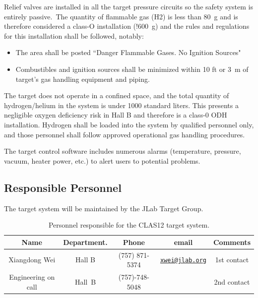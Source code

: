 Relief valves are installed in all the target pressure circuits so the safety system is entirely passive.~The quantity of flammable gas (H2) is less than 80~g and is therefore considered a class-O installation (!600~g) and the rules and regulations for this installation shall be followed, notably:

\begin{itemize}
\item The area shall be posted ``Danger Flammable Gases. No Ignition Sources" 
\item Combustibles and ignition sources shall be minimized within 10 ft or 3~m of target’s gas handling equipment and piping.
\end{itemize}

The target does not operate in a confined space, and the total quantity of hydrogen/helium in the system is under 1000 standard liters. This presents a negligible oxygen deficiency risk in Hall B and therefore is a class-0 ODH installation.  Hydrogen shall be loaded into the system by qualified personnel only, and those personnel shall follow approved operational gas handling procedures.

The target control software includes numerous alarms (temperature, pressure, vacuum, heater power, etc.) to alert users to potential problems.

\subsection{Responsible Personnel}

The target system will be maintained by the JLab Target Group.  

\begin{table}[!htb]
\centering
\begin{tabular}{|c|c|c|c|c|}
\hline
 Name&Department.&Phone&email&Comments \\ \hline
Xiangdong Wei & Hall B &(757) 871-5374&\href{mailto:xwei@jlab.org}{\nolinkurl{xwei@jlab.org}} &1st contact \\ \hline
Engineering on call & Hall~B&(757)-748-5048&& 2nd contact  \\ \hline
\end{tabular}
\caption{Personnel responsible for the CLAS12 target system.} 
\label{tb:target}
\end{table}
